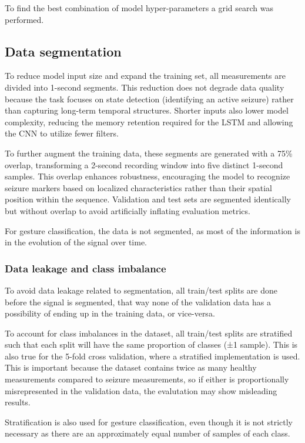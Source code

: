 To find the best combination of model hyper-parameters a grid search was performed.

\subsection{Data segmentation}
To reduce model input size and expand the training set, all measurements are divided into 1-second segments. This reduction does not degrade data quality because the task focuses on state detection (identifying an active seizure) rather than capturing long-term temporal structures. Shorter inputs also lower model complexity, reducing the memory retention required for the LSTM and allowing the CNN to utilize fewer filters.

To further augment the training data, these segments are generated with a 75\% overlap, transforming a 2-second recording window into five distinct 1-second samples. This overlap enhances robustness, encouraging the model to recognize seizure markers based on localized characteristics rather than their spatial position within the sequence. Validation and test sets are segmented identically but without overlap to avoid artificially inflating evaluation metrics.

For gesture classification, the data is not segmented, as most of the information is in the evolution of the signal over time.

\subsubsection{Data leakage and class imbalance}
To avoid data leakage related to segmentation, all train/test splits are done before the signal is segmented, that way none of the validation data has a possibility of ending up in the training data, or vice-versa.

To account for class imbalances in the dataset, all train/test splits are stratified such that each split will have the same proportion of classes (±1 sample). This is also true for the 5-fold cross validation, where a stratified implementation is used. This is important because the dataset contains twice as many healthy measurements compared to seizure measurements, so if either is proportionally misrepresented in the validation data, the evalutation may show misleading results.

Stratification is also used for gesture classification, even though it is not strictly necessary as there are an approximately equal number of samples of each class.


